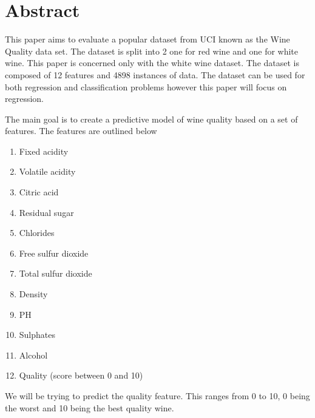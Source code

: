 \section{Abstract}

This paper aims to evaluate a popular dataset from UCI known as the Wine Quality data set. The dataset is split into 2 one for red wine and one for white wine. This paper is concerned only with the white wine dataset. The dataset is composed of 12 features and 4898 instances of data. The dataset can be used for both regression and classification problems however this paper will focus on regression.

The main goal is to create a predictive model of wine quality based on a set of features. The features are outlined below

\begin{enumerate}
  \item Fixed acidity 
  \item Volatile acidity
  \item Citric acid 
  \item Residual sugar 
  \item Chlorides
  \item Free sulfur dioxide 
  \item Total sulfur dioxide 
  \item Density
  \item PH
  \item Sulphates
  \item Alcohol
  \item Quality (score between 0 and 10)
\end{enumerate}

We will be trying to predict the quality feature. This ranges from 0 to 10, 0 being the worst and 10 being the best quality wine.